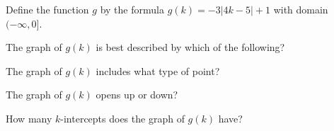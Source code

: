 \documentclass{ximera}
\begin{document}
\begin{definition}
Define the function $g$ by the formula $g(k) = -3|4k-5| + 1$ with domain $(-\infty, 0]$.

\end{definition}



\begin{exercise}
The graph of $g(k)$ is best described by which of the following?

\begin{multipleChoice}
\end{multipleChoice}

\end{exercise}




\begin{exercise}
The graph of $g(k)$ includes what type of point?

\begin{multipleChoice}
\end{multipleChoice}

\end{exercise}



\begin{exercise}
The graph of $g(k)$ opens up or down?

\begin{multipleChoice}
\end{multipleChoice}

\end{exercise}






\begin{exercise}
How many $k$-intercepts does the graph of $g(k)$ have?

\begin{multipleChoice}
\end{multipleChoice}

\end{exercise}
\end{document}
